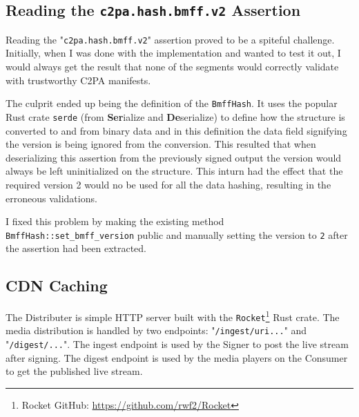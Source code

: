 
\subsection{Reading the \texttt{c2pa.hash.bmff.v2} Assertion}

Reading the "\texttt{c2pa.hash.bmff.v2}" assertion proved to be a spiteful challenge. Initially, when I was done with the implementation and wanted to test it out, I would always get the result that none of the segments would correctly validate with trustworthy C2PA manifests.

The culprit ended up being the definition of the \texttt{BmffHash}. It uses the popular Rust crate \texttt{serde} (from \textbf{Ser}ialize and \textbf{De}serialize) to define how the structure is converted to and from binary data and in this definition the data field signifying the version is being ignored from the conversion. This resulted that when deserializing this assertion from the previously signed output the version would always be left uninitialized on the structure. This inturn had the effect that the required version 2 would no be used for all the data hashing, resulting in the erroneous validations.

I fixed this problem by making the existing method \texttt{BmffHash::set\_bmff\_version} public and manually setting the version to \texttt{2} after the assertion had been extracted.

\subsection{CDN Caching\label{sec:caching}}

The Distributer is simple HTTP server built with the \texttt{Rocket}\footnote{Rocket GitHub: \url{https://github.com/rwf2/Rocket}} Rust crate. The media distribution is handled by two endpoints: "\texttt{/ingest/uri...}" and "\texttt{/digest/...}". The ingest endpoint is used by the Signer to post the live stream after signing. The digest endpoint is used by the media players on the Consumer to get the published live stream.

